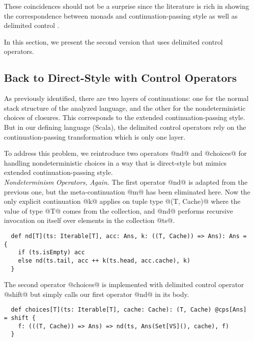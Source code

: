 \documentclass[acmsmall, review]{acmart}\settopmatter{}
\begin{document}
These coincidences should not be a surprise since the literature is rich
in showing the correspondence between monads and continuation-passing style as well as
delimited control \cite{Danvy:1990:AC:91556.91622, wadler1992essence,
danvy1992representing, moggi1991notions}.

In this section, we present the second version that uses delimited control operators.

\subsection{Back to Direct-Style with Control Operators} \label{uncps}

As previously identified, there are two layers of continuations: one for the normal stack 
structure of the analyzed language, and the other for the nondeterministic choices of closures.
This corresponds to the extended continuation-passing style.
But in our defining language (Scala), the delimited control operators rely on the continuation-passing 
transformation which is only one layer.

To address this problem, we reintroduce two operators @nd@ and @choices@ for handling 
nondeterministic choices in a way that is direct-style but mimics extended 
continuation-passing style. \\

\textit{Nondeterminism Operators, Again.}
The first operator @nd@ is adapted from the previous one, but the meta-continuation
@m@ has been eliminated here. Now the only explicit continuation @k@ applies on tuple 
type @(T, Cache)@ where the value of type @T@ comes from the collection, and @nd@ performs 
recursive invocation on itself over elements in the collection @ts@. 

\begin{lstlisting}
  def nd[T](ts: Iterable[T], acc: Ans, k: ((T, Cache)) => Ans): Ans = {
    if (ts.isEmpty) acc
    else nd(ts.tail, acc ++ k(ts.head, acc.cache), k)
  }
\end{lstlisting}

The second operator @choices@ is implemented with delimited control operator 
@shift@ but simply calls our first operator @nd@ in its body.

\begin{lstlisting}
  def choices[T](ts: Iterable[T], cache: Cache): (T, Cache) @cps[Ans] = shift {
    f: (((T, Cache)) => Ans) => nd(ts, Ans(Set[VS](), cache), f)
  }
\end{lstlisting}
\end{document}
